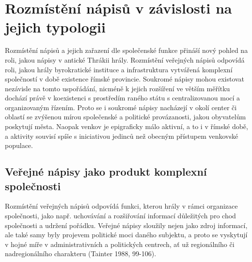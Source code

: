 \section[rozmístění-nápisů-v-závislosti-na-jejich-typologii]{Rozmístění nápisů v závislosti na jejich typologii}

Rozmístění nápisů a jejich zařazení dle společenské funkce přináší nový pohled na roli, jakou nápisy v antické Thrákii hrály. Rozmístění veřejných nápisů odpovídá roli, jakou hrály byrokratické instituce a infrastruktura vytvářená komplexní společností v době existence římské provincie. Soukromé nápisy mohou existovat nezávisle na tomto uspořádání, nicméně k jejich rozšíření ve větším měřítku dochází právě v koexistenci s prostředím raného státu s centralizovanou mocí a organizovaným řízením. Proto se i soukromé nápisy nacházejí v okolí center či oblastí se zvýšenou mírou společenské a politické provázanosti, jakou obyvatelům poskytují města. Naopak venkov je epigraficky málo aktivní, a to i v římské době, a aktivity souvisí spíše s iniciativou jedinců než obecným přístupem venkovské populace.

\subsection[veřejné-nápisy-jako-produkt-komplexní-společnosti]{Veřejné nápisy jako produkt komplexní společnosti}

Rozmístění veřejných nápisů odpovídá funkci, kterou hrály v rámci organizace společnosti, jako např. uchovávání a rozšiřování informací důležitých pro chod společnosti a udržení pořádku. Veřejné nápisy sloužily nejen jako zdroj informací, ale také samy byly projevem politické moci daného subjektu, a proto se vyskytují v hojné míře v administrativních a politických centrech, ať už regionálního či nadregionálního charakteru (Tainter 1988, 99-106).

